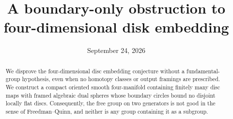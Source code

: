 \documentclass[11pt,reqno]{amsart}
\title[A boundary-only obstruction to disk embedding]{A boundary-only obstruction to four-dimensional disk embedding}
\author{\NoCaseChange{OpenAI}}
\date{September 24, 2026}
\numberwithin{equation}{section}
\theoremstyle{definition}
\theoremstyle{remark}
\begin{document}
\begin{abstract}
We disprove the four-dimensional disc embedding conjecture without a
fundamental-group hypothesis, even when no homotopy classes or output framings
are prescribed. We construct a compact oriented smooth four-manifold containing
finitely many disc maps with framed algebraic dual spheres whose boundary
circles bound no disjoint locally flat discs. Consequently, the free group on
two generators is not good in the sense of Freedman--Quinn, and neither is any
group containing it as a subgroup.
\end{abstract}
\maketitle
\clearpage
\tableofcontents
\clearpage









\end{document}
